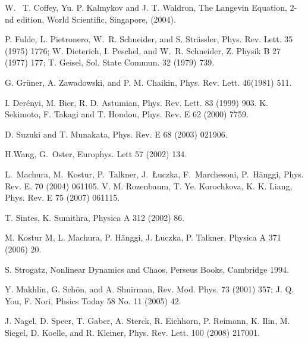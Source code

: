 \documentclass{physeauth}
\begin{document}
\begin{thebibliography}{100}
 W.~ T. Coffey, Yu. P. Kalmykov and J. T. Waldron, 
    The Langevin Equation, 2-nd edition, World Scientific,
  Singapore, (2004).

 P. Fulde, L. Pietronero, W.~R. Schneider, and S.
  Str\"assler, Phys.  Rev. Lett.  35 (1975) 1776; W. Dieterich,
  I. Peschel, and W.~R. Schneider, Z. Physik B  27 (1977) 177;
  T. Geisel, Sol.  State Commun.  32 (1979) 739.

 G. Gr\"uner, A. Zawadowski, and P. M. Chaikin, Phys.
  Rev. Lett. 46(1981) 511.
	
 I.  Derényi, M.  Bier,  R. D.  Astumian, 
Phys. Rev. Lett. 83 (1999) 903. 
 K. Sekimoto, F. Takagi and T. Hondou,  Phys. Rev. E 62 (2000) 7759.

 D. Suzuki and T. Munakata, Phys. Rev. E  68 (2003) 021906.

 H.Wang, G.~Oster, Europhys. Lett  57 (2002) 134.

L.~Machura, M.~Kostur, P.~Talkner, J.~{\L}uczka, F.~Marchesoni, P.~H\"anggi,
  Phys. Rev. E.  70 (2004) 061105.
 V. M. Rozenbaum, T. Ye. Korochkova, K. K. Liang, Phys. Rev. E 75 (2007) 061115.  

 T. Sintes, K. Sumithra, Physica A 312 (2002) 86. 

 M. Kostur M, L.  Machura, P.  H\"anggi,  J. {\L}uczka, P. Talkner,  Physica A  371 (2006)  20. 

 S. Strogatz,  Nonlinear Dynamics and Chaos,
  Perseus Books, Cambridge 1994.

   Y.  Makhlin, G. Sch\"on, and A.  Shnirman, Rev. Mod. Phys. 73 (2001) 357; 
J. Q. You, F. Nori, Phsics Today 58 No. 11  (2005) 42.

J. Nagel, D. Speer, T. Gaber, A. Sterck, R. Eichhorn, P. Reimann, K. Ilin, M. Siegel, D. Koelle, and R. Kleiner, Phys. Rev. Lett. 100 (2008) 217001.

\end{thebibliography}
\end{document}
